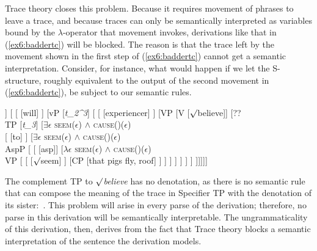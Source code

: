 Trace theory closes this problem. Because it requires movement of phrases to leave a trace, and because traces can only be semantically interpreted as variables bound by the $\lambda$-operator that movement invokes, derivations like that in (\ref{ex6:baddertc}) will be blocked. The reason is that the trace left by the movement shown in the first step of (\ref{ex6:baddertc}) cannot get a semantic interpretation. Consider, for instance, what would happen if we let the S-structure, roughly equivalent to the output of the second movement in (\ref{ex6:baddertc}), be subject to our semantic rules.
\medskip
\begin{fullwidth}
\begin{exe}
\raggedright
	\ex \label{ex6:badt}
	\small
	\begin{forest}
		[TP 
		[DP [they, name=binder, roof] ]
		[
			[ [will] ]
			[vP
				[\emph{t_2^3}]
				[
					[ ]
					[VP
					[V [$\surd$believe]]
					[??\\TP
						[\emph{t_3}]
						[$\exists \epsilon$ \textsc{seem}($\epsilon$) $\wedge$ \textsc{cause}()($\epsilon$) \\
							[ [to] ]
							[$\exists \epsilon$ \textsc{seem}($\epsilon$) $\wedge$ \textsc{cause}()($\epsilon$) \\AspP [
							[ [asp]]
							[$\lambda \epsilon$ \textsc{seem}($\epsilon$) $\wedge$ \textsc{cause}()($\epsilon$) \\VP [
								[ [$\surd$seem] ]
								[CP [that pigs fly, roof] ]
							] ]
						 ]
					 ]
				 ]
			 ]
		]]]]]
		\end{forest}%
\end{exe}
\end{fullwidth}
\medskip
The complement TP to \emph{$\surd$believe} has no denotation, as there is no semantic rule that can compose the meaning of the trace in Specifier TP with the denotation of its sister:~. This problem will arise in every parse of the derivation; therefore, no parse in this derivation will be semantically interpretable. The ungrammaticality of this derivation, then, derives from the fact that Trace theory blocks a semantic interpretation of the sentence the derivation models.

